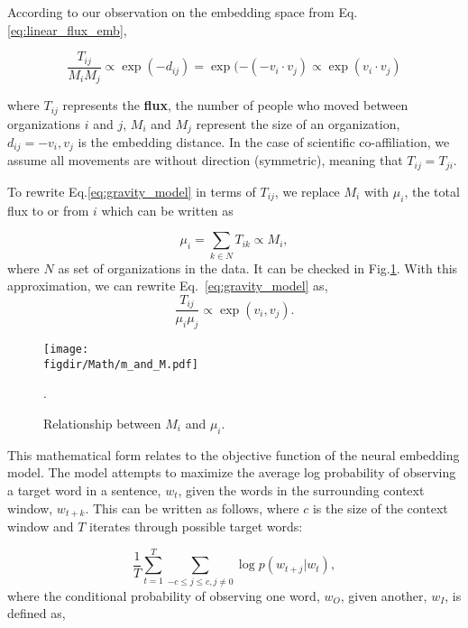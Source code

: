 \documentclass[12pt]{article} %
\def\figdir{../Figs}
\begin{document}
According to our observation on the embedding space from Eq.\ref{eq:linear_flux_emb},

\begin{equation}
    \label{eq:gravity_model}
    \frac{T_{ij}}{M_{i} M_{j}} \propto \exp(-d_{ij}) =  \exp(- (-v_i \cdot v_j) \propto \exp(v_i \cdot v_j) 
\end{equation}

where $T_{ij}$ represents the \textbf{flux}, the number of people who moved between organizations $i$ and $j$,  $M_{i}$ and $M_{j}$ represent the size of an organization,  $d_{ij} = - v_{i}, v_{j}$ is the embedding distance.  In the case of scientific co-affiliation, we assume all movements are without direction (symmetric), meaning that  $T_{ij} = T_{ji}$. 


To rewrite  Eq.\ref{eq:gravity_model} in terms of $T_{ij}$, we replace  $M_i$ with $\mu_{i}$, the total flux to or from $i$ which can be written as

\begin{equation}
	\label{eq:approxi_mass_term}
    \mu_{i} = \sum_{k \in N} T_{ik} \propto M_i,
\end{equation}
where $N$ as set of organizations in the data. It can be checked in Fig.\ref{fig:math_part}. With this approximation, we can rewrite Eq.~\ref{eq:gravity_model} as,
\begin{equation}
   \frac{T_{ij}}{\mu_{i} \mu_{j}} \propto \exp(v_i,v_j).
\end{equation}



%
%
\begin{figure}
    \centering
    \texttt{[image: \\figdir/Math/m\_and\_M.pdf]}
    \caption{
    Relationship between $M_i$ and $\mu_i$.}.
    \label{fig:math_part}
\end{figure}

This mathematical form relates to the objective function of the neural embedding model. The model attempts to maximize the average log probability of observing a target word in a sentence, $w_{t}$, given the words in the surrounding context window, $w_{t + k}$. This can be written as follows, where $c$ is the size of the context window and $T$ iterates through possible target words:

\begin{equation}
    \label{eq:skipgram_log_prob_condensed}
    \frac{1}{T}\sum_{t=1}^{T} \sum_{-c \le j \le c, j \neq 0} \log p(w_{t+j}|w_t),
\end{equation}
where the conditional probability of observing one word, $w_{O}$, given another, $w_{I}$, is defined as,
\end{document}
